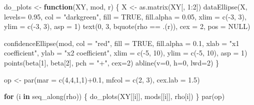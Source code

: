 \documentclass[
  letterpaper,
  10pt,
  krantz2]{krantz}
\makeatletter
\newenvironment{Shaded}{\begin{snugshade}}{\end{snugshade}}
\newcommand{\AttributeTok}[1]{\textcolor[rgb]{0.40,0.45,0.13}{#1}}
\newcommand{\ConstantTok}[1]{\textcolor[rgb]{0.56,0.35,0.01}{#1}}
\newcommand{\ControlFlowTok}[1]{\textcolor[rgb]{0.00,0.23,0.31}{\textbf{#1}}}
\newcommand{\DecValTok}[1]{\textcolor[rgb]{0.68,0.00,0.00}{#1}}
\newcommand{\FloatTok}[1]{\textcolor[rgb]{0.68,0.00,0.00}{#1}}
\newcommand{\FunctionTok}[1]{\textcolor[rgb]{0.28,0.35,0.67}{#1}}
\newcommand{\NormalTok}[1]{\textcolor[rgb]{0.00,0.23,0.31}{#1}}
\newcommand{\OtherTok}[1]{\textcolor[rgb]{0.00,0.23,0.31}{#1}}
\newcommand{\SpecialCharTok}[1]{\textcolor[rgb]{0.37,0.37,0.37}{#1}}
\newcommand{\StringTok}[1]{\textcolor[rgb]{0.13,0.47,0.30}{#1}}
\newenvironment{kframe}{%
  \medskip{}
  \setlength{\fboxsep}{.8em}
  \def\at@end@of@kframe{}%
  \ifinner\ifhmode%
  \def\at@end@of@kframe{\end{minipage}}%
  \begin{minipage}{\columnwidth}%
  \fi\fi%
  \def\FrameCommand##1{\hskip\@totalleftmargin \hskip-\fboxsep
  \colorbox{shadecolor}{##1}\hskip-\fboxsep
      \hskip-\linewidth \hskip-\@totalleftmargin \hskip\columnwidth}%
  \MakeFramed {\advance\hsize-\width
    \@totalleftmargin\z@ \linewidth\hsize
    \@setminipage}}%
{\par\unskip\endMakeFramed%
  \at@end@of@kframe}
\renewenvironment{Shaded}{\begin{kframe}}{\end{kframe}}
\makeatother
\begin{document}
\begin{Shaded}
\begin{Highlighting}[]
\NormalTok{do\_plots }\OtherTok{\textless{}{-}} \ControlFlowTok{function}\NormalTok{(XY, mod, r) \{}
\NormalTok{  X }\OtherTok{\textless{}{-}} \FunctionTok{as.matrix}\NormalTok{(XY[, }\DecValTok{1}\SpecialCharTok{:}\DecValTok{2}\NormalTok{])}
  \FunctionTok{dataEllipse}\NormalTok{(X,}
              \AttributeTok{levels=} \FloatTok{0.95}\NormalTok{,}
              \AttributeTok{col =} \StringTok{"darkgreen"}\NormalTok{,}
              \AttributeTok{fill =} \ConstantTok{TRUE}\NormalTok{, }\AttributeTok{fill.alpha =} \FloatTok{0.05}\NormalTok{,}
              \AttributeTok{xlim =} \FunctionTok{c}\NormalTok{(}\SpecialCharTok{{-}}\DecValTok{3}\NormalTok{, }\DecValTok{3}\NormalTok{),}
              \AttributeTok{ylim =} \FunctionTok{c}\NormalTok{(}\SpecialCharTok{{-}}\DecValTok{3}\NormalTok{, }\DecValTok{3}\NormalTok{), }\AttributeTok{asp =} \DecValTok{1}\NormalTok{)}
  \FunctionTok{text}\NormalTok{(}\DecValTok{0}\NormalTok{, }\DecValTok{3}\NormalTok{, }\FunctionTok{bquote}\NormalTok{(rho }\SpecialCharTok{==}\NormalTok{ .(r)), }\AttributeTok{cex =} \DecValTok{2}\NormalTok{, }\AttributeTok{pos =} \ConstantTok{NULL}\NormalTok{)}

  \FunctionTok{confidenceEllipse}\NormalTok{(mod,}
                    \AttributeTok{col =} \StringTok{"red"}\NormalTok{,}
                    \AttributeTok{fill =} \ConstantTok{TRUE}\NormalTok{, }\AttributeTok{fill.alpha =} \FloatTok{0.1}\NormalTok{,}
                    \AttributeTok{xlab =} \StringTok{"x1 coefficient"}\NormalTok{,}
                    \AttributeTok{ylab =} \StringTok{"x2 coefficient"}\NormalTok{,}
                    \AttributeTok{xlim =} \FunctionTok{c}\NormalTok{(}\SpecialCharTok{{-}}\DecValTok{5}\NormalTok{, }\DecValTok{10}\NormalTok{),}
                    \AttributeTok{ylim =} \FunctionTok{c}\NormalTok{(}\SpecialCharTok{{-}}\DecValTok{5}\NormalTok{, }\DecValTok{10}\NormalTok{),}
                    \AttributeTok{asp =} \DecValTok{1}\NormalTok{)}
  \FunctionTok{points}\NormalTok{(beta[}\DecValTok{1}\NormalTok{], beta[}\DecValTok{2}\NormalTok{], }\AttributeTok{pch =} \StringTok{"+"}\NormalTok{, }\AttributeTok{cex=}\DecValTok{2}\NormalTok{)}
  \FunctionTok{abline}\NormalTok{(}\AttributeTok{v=}\DecValTok{0}\NormalTok{, }\AttributeTok{h=}\DecValTok{0}\NormalTok{, }\AttributeTok{lwd=}\DecValTok{2}\NormalTok{)}
\NormalTok{\}}

\NormalTok{op }\OtherTok{\textless{}{-}} \FunctionTok{par}\NormalTok{(}\AttributeTok{mar =} \FunctionTok{c}\NormalTok{(}\DecValTok{4}\NormalTok{,}\DecValTok{4}\NormalTok{,}\DecValTok{1}\NormalTok{,}\DecValTok{1}\NormalTok{)}\SpecialCharTok{+}\FloatTok{0.1}\NormalTok{,}
          \AttributeTok{mfcol =} \FunctionTok{c}\NormalTok{(}\DecValTok{2}\NormalTok{, }\DecValTok{3}\NormalTok{),}
          \AttributeTok{cex.lab =} \FloatTok{1.5}\NormalTok{)}

\ControlFlowTok{for}\NormalTok{ (i }\ControlFlowTok{in} \FunctionTok{seq\_along}\NormalTok{(rho)) \{}
  \FunctionTok{do\_plots}\NormalTok{(XY[[i]], mods[[i]], rho[i])}
\NormalTok{\}}
\FunctionTok{par}\NormalTok{(op)}
\end{Highlighting}
\end{Shaded}
\end{document}
